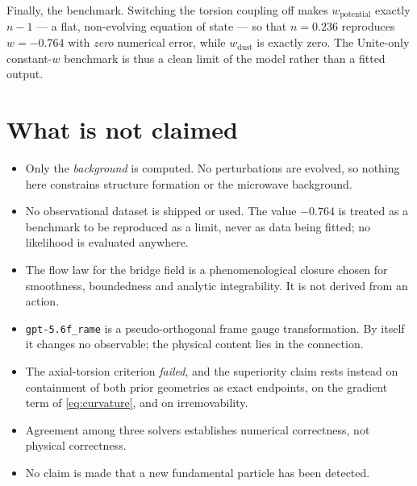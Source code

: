 \documentclass[11pt]{article}
\begin{document}
Finally, the benchmark. Switching the torsion coupling off makes
$w_{\mathrm{potential}}$ exactly $n-1$ --- a flat, non-evolving equation of
state --- so that $n=0.236$ reproduces $w=-0.764$ with \emph{zero} numerical
error, while $w_{\mathrm{dust}}$ is exactly zero. The Unite-only constant-$w$
benchmark is thus a clean limit of the model rather than a fitted output.

\section{What is not claimed}

\begin{itemize}
  \item Only the \emph{background} is computed. No perturbations are evolved, so
  nothing here constrains structure formation or the microwave background.
  \item No observational dataset is shipped or used. The value $-0.764$ is
  treated as a benchmark to be reproduced as a limit, never as data being
  fitted; no likelihood is evaluated anywhere.
  \item The flow law for the bridge field is a phenomenological closure chosen
  for smoothness, boundedness and analytic integrability. It is not derived from
  an action.
  \item \texttt{gpt-5.6f\_rame} is a pseudo-orthogonal frame gauge
  transformation. By itself it changes no observable; the physical content lies
  in the connection.
  \item The axial-torsion criterion \emph{failed}, and the superiority claim
  rests instead on containment of both prior geometries as exact endpoints, on
  the gradient term of \eqref{eq:curvature}, and on irremovability.
  \item Agreement among three solvers establishes numerical correctness, not
  physical correctness.
  \item No claim is made that a new fundamental particle has been detected.
\end{itemize}
\end{document}
